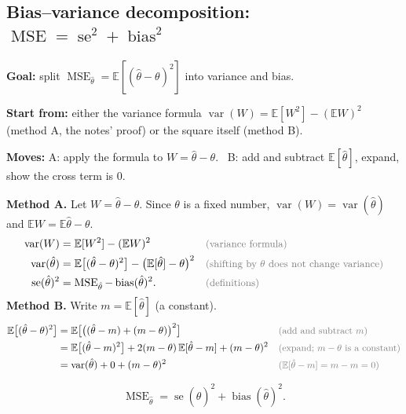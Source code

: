\documentclass[11pt]{article}
\newcommand{\E}{\mathbb{E}}
\newcommand{\Var}{\operatorname{var}}
\newcommand{\se}{\operatorname{se}}
\newcommand{\MSE}{\operatorname{MSE}}
\newcommand{\bias}{\operatorname{bias}}
\newcommand{\why}[1]{&&\text{\small\color{gray}(#1)}}
\newcommand{\mv}[1]{\tcbox[on line, colback=methodclr, colframe=methodclr, coltext=white, boxsep=0pt,
  left=2pt, right=2pt, top=1pt, bottom=1pt, arc=1.5pt]{\sffamily\scriptsize\bfseries M#1}}
\newcommand{\goal}[1]{\textbf{Goal:} #1\par}
\newcommand{\start}[1]{\textbf{Start from:} #1\par}
\newcommand{\moves}[1]{\textbf{Moves:} #1\par}
\begin{document}
\subsection{Bias--variance decomposition: $\MSE=\se^2+\bias^2$}\label{sec:mse}
\begin{methodbox}
\goal{split $\MSE_{\hat\theta}=\E[(\hat\theta-\theta)^2]$ into variance and bias.}
\start{either the variance formula $\Var(W)=\E[W^2]-(\E W)^2$ (method A, the notes' proof) or the square itself (method B).}
\moves{A: apply the formula to $W=\hat\theta-\theta$. \ B: \mv{10} add and subtract $\E[\hat\theta]$, expand, show the cross term is $0$.}
\end{methodbox}
\textbf{Method A.} Let $W=\hat\theta-\theta$. Since $\theta$ is a fixed number, $\Var(W)=\Var(\hat\theta)$ and $\E W=\E\hat\theta-\theta$.
\begin{align*}
\Var(W)&=\E[W^2]-(\E W)^2 \why{variance formula}\\
\Var(\hat\theta)&=\E\big[(\hat\theta-\theta)^2\big]-\big(\E[\hat\theta]-\theta\big)^2 \why{shifting by $\theta$ does not change variance}\\
\se(\hat\theta)^2&=\MSE_{\hat\theta}-\bias(\hat\theta)^2 . \why{definitions}
\end{align*}
\textbf{Method B.} Write $m=\E[\hat\theta]$ (a constant).
\begin{align*}
\E\big[(\hat\theta-\theta)^2\big]&=\E\big[\big((\hat\theta-m)+(m-\theta)\big)^2\big] \why{add and subtract $m$}\\
&=\E\big[(\hat\theta-m)^2\big]+2(m-\theta)\,\E[\hat\theta-m]+(m-\theta)^2 \why{expand; $m-\theta$ is a constant}\\
&=\Var(\hat\theta)+0+(m-\theta)^2 \why{$\E[\hat\theta-m]=m-m=0$}
\end{align*}
\begin{keybox}
\[\MSE_{\hat\theta}=\se(\hat\theta)^2+\bias(\hat\theta)^2 .\]
\end{keybox}
\end{document}
